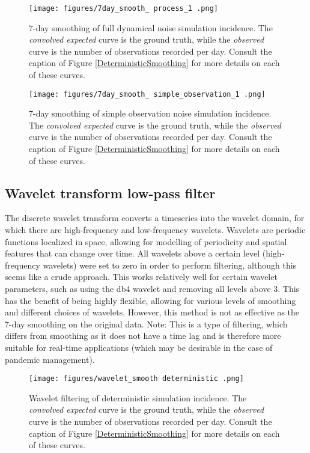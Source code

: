 \documentclass{article}
\begin{document}
\clearpage
\begin{figure}[h!]
    \centering
    \texttt{[image: figures/7day\_smooth\_ process\_1 .png]}
    \caption{7-day smoothing of full dynamical noise simulation incidence. The \emph{convolved expected} curve is the ground truth, while the \emph{observed} curve is the number of observations recorded per day. Consult the caption of Figure \ref{DeterministicSmoothing} for more details on each of these curves.}
\end{figure}

\clearpage
\begin{figure}[h!]
    \centering
    \texttt{[image: figures/7day\_smooth\_ simple\_observation\_1 .png]}
    \caption{7-day smoothing of simple observation noise simulation incidence. The \emph{convolved expected} curve is the ground truth, while the \emph{observed} curve is the number of observations recorded per day. Consult the caption of Figure \ref{DeterministicSmoothing} for more details on each of these curves.}
\end{figure}

\subsection{Wavelet transform low-pass filter}
The discrete wavelet transform converts a timeseries into the wavelet domain, for which there are high-frequency and low-frequency wavelets. Wavelets are periodic functions localized in space, allowing for modelling of periodicity and spatial features that can change over time. All wavelets above a certain level (high-frequency wavelets) were set to zero in order to perform filtering, although this seems like a crude approach. This works relatively well for certain wavelet parameters, such as using the db4 wavelet and removing all levels above 3. This has the benefit of being highly flexible, allowing for various levels of smoothing and different choices of wavelets. However, this method is not as effective as the 7-day smoothing on the original data. Note: This is a type of filtering, which differs from smoothing as it does not have a time lag and is therefore more suitable for real-time applications (which may be desirable in the case of pandemic management).

\clearpage
\begin{figure}[h!]
    \centering
    \texttt{[image: figures/wavelet\_smooth deterministic .png]}
    \caption{Wavelet filtering of deterministic simulation incidence. The \emph{convolved expected} curve is the ground truth, while the \emph{observed} curve is the number of observations recorded per day. Consult the caption of Figure \ref{DeterministicSmoothing} for more details on each of these curves.}
\end{figure}
\end{document}
